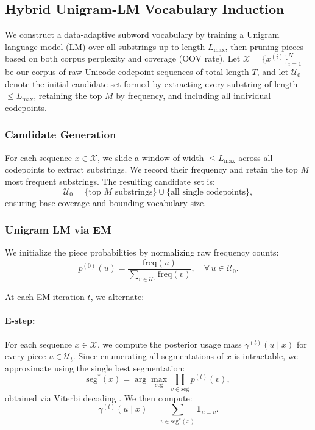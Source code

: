\subsection{Hybrid Unigram‐LM Vocabulary Induction}
\label{sec:vocab-induction}

We construct a data‐adaptive subword vocabulary by training a Unigram language model (LM) over all substrings up to length \(L_{\max}\), then pruning pieces based on both corpus perplexity and coverage (OOV rate). Let
\(\mathcal X = \{x^{(i)}\}_{i=1}^N\)
be our corpus of raw Unicode codepoint sequences of total length \(T\), and let \(\mathcal U_{0}\) denote the initial candidate set formed by extracting every substring of length \(\le L_{\max}\), retaining the top \(M\) by frequency, and including all individual codepoints.

\subsubsection{Candidate Generation}

For each sequence \(x \in \mathcal X\), we slide a window of width \(\le L_{\max}\) across all codepoints to extract substrings. We record their frequency and retain the top \(M\) most frequent substrings. The resulting candidate set is:
\[
\mathcal U_{0}
= \{\text{top }M\text{ substrings}\} \cup \{\text{all single codepoints}\},
\]
ensuring base coverage and bounding vocabulary size.

\subsubsection{Unigram LM via EM}

We initialize the piece probabilities by normalizing raw frequency counts:
\[
p^{(0)}(u)
= \frac{\mathrm{freq}(u)}{\sum_{v\in\mathcal U_{0}}\mathrm{freq}(v)},
\quad
\forall\,u\in\mathcal U_{0}.
\]

At each EM iteration \(t\), we alternate:

\paragraph{E-step:}

For each sequence \(x\in\mathcal X\), we compute the posterior usage mass \(\gamma^{(t)}(u \mid x)\) for every piece \(u\in \mathcal U_t\). Since enumerating all segmentations of \(x\) is intractable, we approximate using the single best segmentation:
\[
\mathrm{seg}^{*}(x)
= \arg\max_{\mathrm{seg}} \prod_{v\in\mathrm{seg}} p^{(t)}(v),
\]
obtained via Viterbi decoding \cite{kudo2018sentencepiece}. We then compute:
\[
\gamma^{(t)}(u \mid x)
= \sum_{v \in \mathrm{seg}^{*}(x)} \mathbf{1}_{u = v}.
\]

